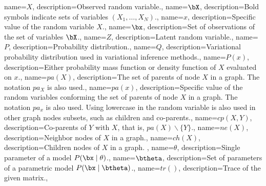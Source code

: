 {
  name={\(X\)},
  description={Observed random variable.},
}
{
  name={\(\bX\)},
  description={Bold symbols indicate sets of variables \((X_{1},\dots,X_{N})\).},
}
{
  name={\(x\)},
  description={Specific value of the random variable \(X\).},
}
{
  name={\(\bx\)},
  description={Set of observations of the set of variables \(\bX\).},
}
{
  name={\ensuremath{Z}},
  description={Latent random variable.},
}
{
  name={\ensuremath{P}},
  description={Probability distribution.},
}
{
  name={\ensuremath{Q}},
  description={Variational probability distribution used in variational inference methods.},
}
{
  name={\ensuremath{P(x)}},
  description={Either probability mass function or density function of \(X\) evaluated on \(x\).},
}
{
  name={\ensuremath{pa(X)}},
  description={The set of parents of node \(X\) in a graph. The notation \(pa_{X}\) is also used.},
}
{
  name={\ensuremath{pa(x)}},
  description={Specific value of the random variables conforming the set of parents of node \(X\) in a graph. The notation \(pa_{x}\) is also used. Using lowercase in the random variable is also used in other graph nodes subsets, such as children and co-parents.},
}
{
  name={\ensuremath{cp(X,Y)}},
  description={Co-parents of \(Y\) with \(X\), that is, \(pa(X)\backslash \{Y\}\).},
}
{
  name={\ensuremath{ne(X)}},
  description={Neighbor nodes of \(X\) in a graph.},
}
{
  name={\ensuremath{ch(X)}},
  description={Children nodes of \(X\) in a graph. },
}
{
  name={\ensuremath{\theta}},
  description={Single parameter of a model \(P(\bx \mid \theta)\).},
}
{
  name={\ensuremath{\btheta}},
  description={Set of parameters of a parametric model \(P(\bx \mid \btheta)\).},
}
{
  name={\ensuremath{tr()}},
  description={Trace of the given matrix.},
}
